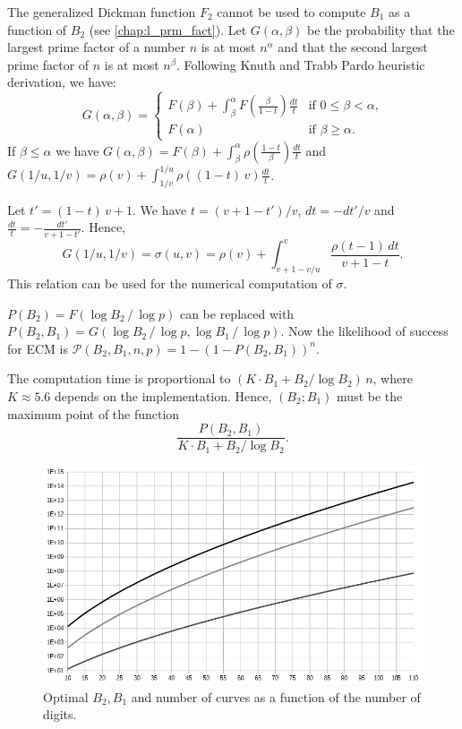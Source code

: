 \documentclass[a4paper, 11pt, pdftex]{report}
\theoremstyle{plain}
\theoremstyle{definition}
\begin{document}
The generalized Dickman function $F_2$ cannot be used to compute $B_1$ as a function of $B_2$ (see \autoref{chap:l_prm_fact}). Let $G(\alpha, \beta)$ be the probability that the largest prime factor
of a number $n$ is at most $n^\alpha$ and that the second largest prime factor of $n$ is at most
$n^\beta$. Following Knuth and Trabb Pardo \cite{KnuthPardo1} heuristic derivation, we have:
\begin{equation*}
G(\alpha, \beta) = \begin{cases}
F(\beta) + \int_\beta^\alpha F \left(\frac{\beta}{1-t} \right) \frac{dt}{t} & \text{if } 0 \leq \beta < \alpha \text{,}\\
F(\alpha) & \text{if } \beta \geq \alpha \text{.}
\end{cases}
\end{equation*}
If $\beta \leq \alpha$ we have
$G(\alpha, \beta) = F(\beta) + \int_\beta^\alpha \rho \left(\frac{1-t}{\beta} \right) \frac{dt}{t}$
and $G(1/u, 1/v) = \rho(v) + \int_{1/v}^{1/u} \rho \left((1-t)\, v \right) \frac{dt}{t}$.

Let $t' = (1-t)\, v + 1$. We have $t = (v + 1 - t')/v$, $dt = -dt'/v$ and
$\frac{dt}{t} = -\frac{dt'}{v + 1 - t'}$. Hence,
$$G(1/u, 1/v) = \sigma(u, v) = \rho(v) + \int_{v + 1 - v/u}^v \frac{\rho(t - 1)\, dt}{v + 1 - t}.$$
This relation can be used for the numerical computation of $\sigma$.

$P(B_2) = F(\log B_2\, /\, \log p)$ can be replaced with $P(B_2, B_1) = G(\log B_2\, /\, \log p,
\log B_1\, /\, \log p)$. Now the likelihood of success for ECM is
$\mathcal{P}(B_2, B_1, n, p) = 1 - \left(1 - P(B_2, B_1) \right)^n$.

The computation time is proportional to $\left(K\cdot B_1 + B_2 / \log B_2 \right)\, n$, where
$K \approx 5.6$ depends on the implementation. Hence, $(B_2; B_1)$ must be the maximum point of the
function
$$\frac{P(B_2, B_1)}{K\cdot B_1 + B_2 / \log B_2}.$$
\begin{figure}[!ht]
	\vspace*{-0.5cm}
	\centering
	\includegraphics[width=15.5cm, angle=0]{img/B1_B2_n_digits.png}
	\caption{\label{fig:B12_dgt} Optimal $B_2, B_1$ and number of curves as a function of the number of digits.}
\end{figure}
\end{document}
